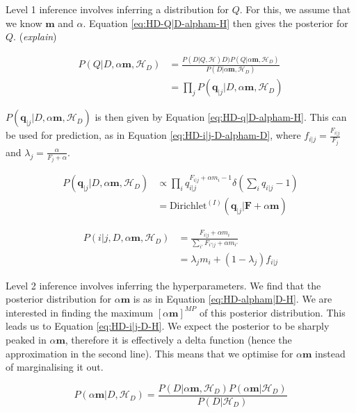 Level 1 inference involves inferring a distribution for $Q$. For this, we assume that we know $\boldsymbol{m}$ and $\alpha$. Equation \ref{eq:HD-Q|D-alpham-H} then gives the posterior for $Q$. (\textit{explain})

\begin{align}
P(Q|D,\alpha\boldsymbol{m},\mathscr{H}_{D})&=\frac{P(D|Q,\mathscr{H}){D})P(Q|\alpha\boldsymbol{m},\mathscr{H}_{D})}{P(D|\alpha\boldsymbol{m},\mathscr{H}_{D})} \nonumber
\\
&=\prod_{j}P(\boldsymbol{q}_{|j}|D,\alpha\boldsymbol{m},\mathscr{H}_{D})
\label{eq:HD-Q|D-alpham-H}
\end{align}

\noindent $P(\boldsymbol{q}_{|j}|D,\alpha\boldsymbol{m},\mathscr{H}_{D})$ is then given by Equation \ref{eq:HD-q|D-alpham-H}. This can be used for prediction, as in Equation \ref{eq:HD-i|j-D-alpham-D}, where $f_{i|j}=\frac{F_{i|j}}{F_{j}}$ and $\lambda_{j}=\frac{\alpha}{F_{j}+\alpha}$.

\begin{align}
P(\boldsymbol{q}_{|j}|D,\alpha\boldsymbol{m},\mathscr{H}_{D})&\propto\prod_{i}q_{i|j}^{F_{i|j}+\alpha m_{i}-1}\delta(\sum_{i}q_{i|j}-1) \nonumber
\\
&=\text{Dirichlet}^{(I)}(\boldsymbol{q}_{|j}|\boldsymbol{F}+\alpha\boldsymbol{m})
\label{eq:HD-q|D-alpham-H}
\end{align}

\begin{align}
P(i|j,D,\alpha\boldsymbol{m},\mathscr{H}_{D})&=\frac{F_{i|j}+\alpha m_{i}}{\sum_{i'}F_{i'|j}+\alpha m_{i'}} \nonumber
\\
&=\lambda_{j}m_{i}+(1-\lambda_{j})f_{i|j}
\label{eq:HD-i|j-D-alpham-D}
\end{align}

Level 2 inference involves inferring the hyperparameters. We find that the posterior distribution for $\alpha\boldsymbol{m}$ is as in Equation \ref{eq:HD-alpham|D-H}. We are interested in finding the maximum $[\alpha\boldsymbol{m}]^{MP}$ of this posterior distribution. This leads us to Equation \ref{eq:HD-i|j-D-H}. We expect the posterior to be sharply peaked in $\alpha\boldsymbol{m}$, therefore it is effectively a delta function (hence the approximation in the second line). This means that we optimise for $\alpha\boldsymbol{m}$ instead of marginalising it out. 

\begin{equation}
P(\alpha\boldsymbol{m}|D,\mathscr{H}_{D})=\frac{P(D|\alpha\boldsymbol{m},\mathscr{H}_{D})P(\alpha\boldsymbol{m}|\mathscr{H}_{D})}{P(D|\mathscr{H}_{D})}
\label{eq:HD-alpham|D-H}
\end{equation}

